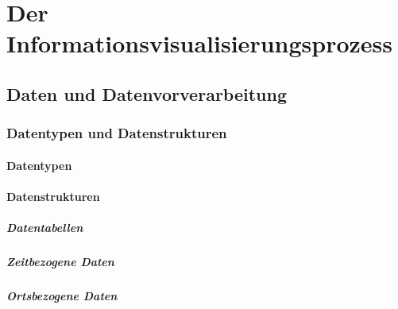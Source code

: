 \chapter{Der Informationsvisualisierungsprozess} %

    \section{Daten und Datenvorverarbeitung} %

        \subsection{Datentypen und Datenstrukturen} %

            \subsubsection{Datentypen} %

            \subsubsection{Datenstrukturen} %

                \paragraph{Datentabellen} %

                \paragraph{Zeitbezogene Daten} %

                \paragraph{Ortsbezogene Daten} %

